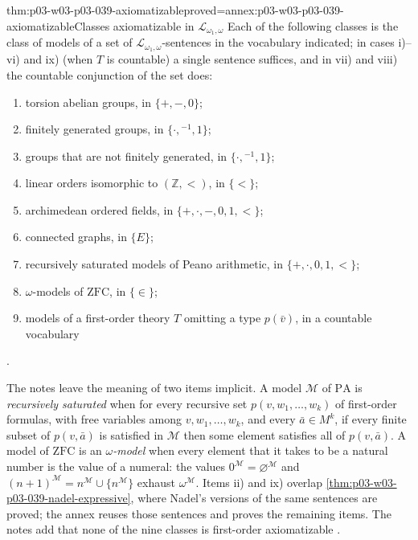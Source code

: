 \begin{hbtheorem}{thm:p03-w03-p03-039-axiomatizable}{proved=annex:p03-w03-p03-039-axiomatizable}{Classes axiomatizable in \(\mathcal L_{\omega_1,\omega}\)}
Each of the following classes is the class of models of a set of
\(\mathcal L_{\omega_1,\omega}\)-sentences in the vocabulary indicated; in
cases i)--vi) and ix) (when \(T\) is countable) a single sentence suffices,
and in vii) and viii) the countable conjunction of the set does:
\begin{enumerate}
\item[i)] torsion abelian groups, in \(\{+,-,0\}\);
\item[ii)] finitely generated groups, in \(\{\cdot,{}^{-1},1\}\);
\item[iii)] groups that are not finitely generated, in \(\{\cdot,{}^{-1},1\}\);
\item[iv)] linear orders isomorphic to \((\mathbb Z,<)\), in \(\{<\}\);
\item[v)] archimedean ordered fields, in \(\{+,\cdot,-,0,1,<\}\);
\item[vi)] connected graphs, in \(\{E\}\);
\item[vii)] recursively saturated models of Peano arithmetic, in
      \(\{+,\cdot,0,1,<\}\);
\item[viii)] \(\omega\)-models of \(\mathrm{ZFC}\), in \(\{\in\}\);
\item[ix)] models of a first-order theory \(T\) omitting a type \(p(\bar v)\),
      in a countable vocabulary
\end{enumerate}
\cite[Ex.~1.7, p.~6]{Marker2014InfinitaryNotes}.
\end{hbtheorem}

The notes leave the meaning of two items implicit. A model \(\mathcal M\) of
\(\mathrm{PA}\) is \emph{recursively saturated} when for every recursive set
\(p(v,w_1,\dots,w_k)\) of first-order formulas, with free variables among
\(v,w_1,\dots,w_k\), and every \(\bar a\in M^k\), if every finite subset of
\(p(v,\bar a)\) is satisfied in \(\mathcal M\) then some element satisfies all
of \(p(v,\bar a)\). A model of \(\mathrm{ZFC}\) is an \emph{\(\omega\)-model}
when every element that it takes to be a natural number is the value of a
numeral: the values \(0^{\mathcal M}=\varnothing^{\mathcal M}\) and
\((n+1)^{\mathcal M}=n^{\mathcal M}\cup\{n^{\mathcal M}\}\) exhaust
\(\omega^{\mathcal M}\). Items ii) and ix) overlap
\cref{thm:p03-w03-p03-039-nadel-expressive}, where Nadel's versions of the
same sentences are proved; the annex reuses those sentences and proves the
remaining items. The notes add that none of the nine classes is first-order
axiomatizable \cite[Ex.~1.8, p.~6]{Marker2014InfinitaryNotes}.

